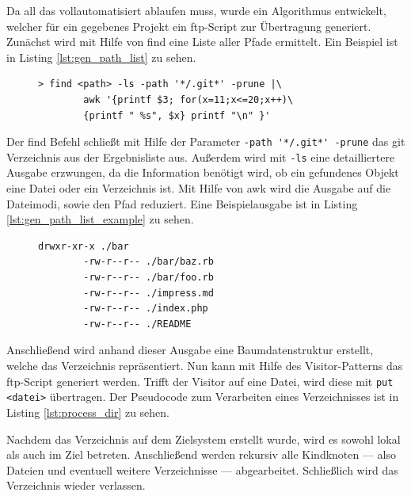 Da all das vollautomatisiert ablaufen muss, wurde ein Algorithmus entwickelt, welcher für ein gegebenes Projekt ein \gls{ftp}-Script zur Übertragung generiert. Zunächst wird mit Hilfe von find eine Liste aller Pfade ermittelt. Ein Beispiel ist in Listing \ref{lst:gen_path_list} zu sehen.

\begin{figure}
	\begin{lstlisting}[caption=Generiere Liste aller Pfade,label={lst:gen_path_list}]
	> find <path> -ls -path '*/.git*' -prune |\
		awk '{printf $3; for(x=11;x<=20;x++)\
		{printf " %s", $x} printf "\n" }'
	\end{lstlisting}
\end{figure}

Der \gls{find} Befehl schließt mit Hilfe der Parameter \lstinline!-path '*/.git*' -prune! das git Verzeichnis aus der Ergebnisliste aus. Außerdem wird mit \lstinline!-ls! eine detailliertere Ausgabe erzwungen, da die Information benötigt wird, ob ein gefundenes Objekt eine Datei oder ein Verzeichnis ist. Mit Hilfe von \gls{awk} wird die Ausgabe auf die Dateimodi, sowie den Pfad reduziert. Eine Beispielausgabe ist in Listing \ref{lst:gen_path_list_example} zu sehen.

\begin{figure}
	\begin{lstlisting}[caption=Beispielausgabe für gefundene Pfade,label={lst:gen_path_list_example}]
		drwxr-xr-x ./bar
		-rw-r--r-- ./bar/baz.rb
		-rw-r--r-- ./bar/foo.rb
		-rw-r--r-- ./impress.md
		-rw-r--r-- ./index.php
		-rw-r--r-- ./README
	\end{lstlisting}
\end{figure}
     
Anschließend wird anhand dieser Ausgabe eine Baumdatenstruktur erstellt, welche das Verzeichnis repräsentiert. Nun kann mit Hilfe des Visitor-Patterns das \gls{ftp}-Script generiert werden. Trifft der Visitor auf eine Datei, wird diese mit \lstinline!put <datei>! übertragen. Der Pseudocode zum Verarbeiten eines Verzeichnisses ist in Listing \ref{lst:process_dir} zu sehen.

Nachdem das Verzeichnis auf dem Zielsystem erstellt wurde, wird es sowohl lokal als auch im Ziel betreten. Anschließend werden rekursiv alle Kindknoten — also Dateien und eventuell weitere Verzeichnisse — abgearbeitet. Schließlich wird das Verzeichnis wieder verlassen.

